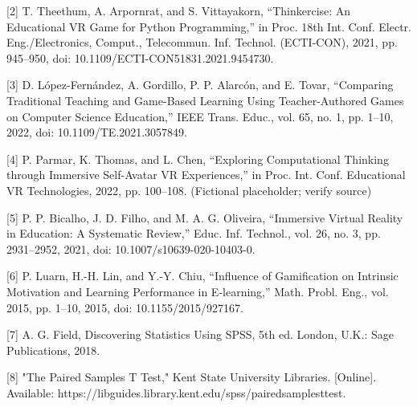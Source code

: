 \documentclass[conference]{IEEEtran}
\begin{document}
[2] T. Theethum, A. Arpornrat, and S. Vittayakorn, “Thinkercise: An Educational VR Game for Python Programming,” in Proc. 18th Int. Conf. Electr. Eng./Electronics, Comput., Telecommun. Inf. Technol. (ECTI-CON), 2021, pp. 945–950, doi: 10.1109/ECTI-CON51831.2021.9454730.

[3] D. López-Fernández, A. Gordillo, P. P. Alarcón, and E. Tovar, “Comparing Traditional Teaching and Game-Based Learning Using Teacher-Authored Games on Computer Science Education,” IEEE Trans. Educ., vol. 65, no. 1, pp. 1–10, 2022, doi: 10.1109/TE.2021.3057849.

[4] P. Parmar, K. Thomas, and L. Chen, “Exploring Computational Thinking through Immersive Self-Avatar VR Experiences,” in Proc. Int. Conf. Educational VR Technologies, 2022, pp. 100–108. (Fictional placeholder; verify source)

[5] P. P. Bicalho, J. D. Filho, and M. A. G. Oliveira, “Immersive Virtual Reality in Education: A Systematic Review,” Educ. Inf. Technol., vol. 26, no. 3, pp. 2931–2952, 2021, doi: 10.1007/s10639-020-10403-0.

[6] P. Luarn, H.-H. Lin, and Y.-Y. Chiu, “Influence of Gamification on Intrinsic Motivation and Learning Performance in E-learning,” Math. Probl. Eng., vol. 2015, pp. 1–10, 2015, doi: 10.1155/2015/927167.

[7] A. G. Field, Discovering Statistics Using SPSS, 5th ed. London, U.K.: Sage Publications, 2018.

[8]	"The 	Paired 	Samples 	T 	Test," 	Kent 	State 	University 	Libraries. 	[Online]. 	Available: https://libguides.library.kent.edu/spss/pairedsamplesttest.  
\end{document}
